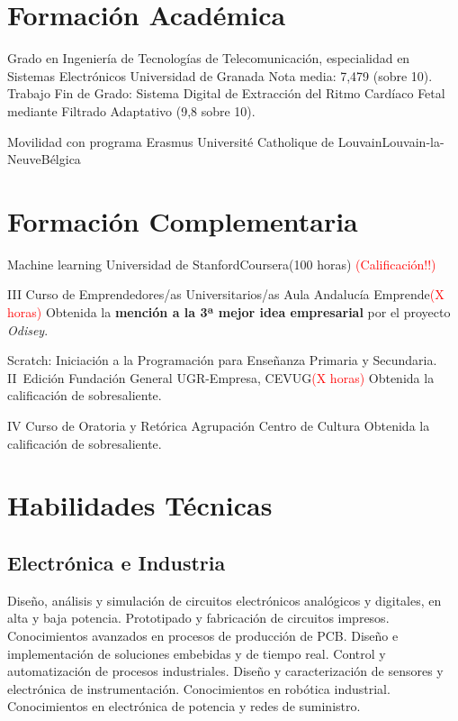 \documentclass[11pt,a4paper,sans,spanish]{moderncv}
\begin{document}
\section{Formación Académica}

{Grado en Ingeniería de Tecnologías de Telecomunicación, especialidad en Sistemas Electrónicos}
{Universidad de Granada}{}{}
{Nota media: 7,479 (sobre 10). 
Trabajo Fin de Grado: 
Sistema Digital de Extracción del Ritmo Cardíaco Fetal mediante Filtrado Adaptativo (9,8 sobre 10).}

{Movilidad con programa Erasmus}
{Université Catholique de Louvain}{Louvain-la-Neuve}{Bélgica}{}


\section{Formación Complementaria}

{Machine learning}
{Universidad de Stanford}{Coursera}{(100 horas)}
{\textcolor{red}{(Calificación!!)}}

{III Curso de Emprendedores/as Universitarios/as}
{Aula Andalucía Emprende}{}{\textcolor{red}{(X horas)}}
{Obtenida la \textbf{mención a la 3ª mejor idea empresarial} por el proyecto \emph{Odisey}. }

{Scratch: Iniciación a la Programación para Enseñanza Primaria y Secundaria. II~Edición}
{Fundación General UGR-Empresa, CEVUG}{}{\textcolor{red}{(X horas)}}
{Obtenida la calificación de sobresaliente.}

{IV Curso de Oratoria y Retórica}
{Agrupación Centro de Cultura}{}{}
{Obtenida la calificación de sobresaliente.}


\section{Habilidades Técnicas}

\subsection{Electrónica e Industria}
{Diseño, análisis y simulación de circuitos electrónicos analógicos y digitales, en alta y baja potencia.}\quad{}
Prototipado y fabricación de circuitos impresos.\quad{}
{Conocimientos avanzados en procesos de producción de PCB.}\quad{} 
Diseño e implementación de soluciones embebidas y de tiempo real.\quad
{Control y automatización de procesos industriales.}\quad
Diseño y caracterización de sensores y electrónica de instrumentación.\quad
{Conocimientos en robótica industrial.}\quad
{Conocimientos en electrónica de potencia y redes de suministro.}
\end{document}
